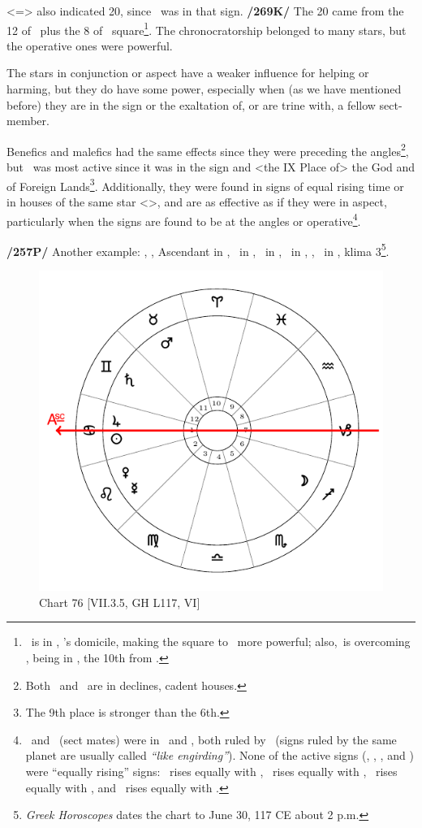\Virgo <=\Mercury> also indicated 20, since \Jupiter\, was in that sign. \textbf{/269K/} The 20 came from the 12 of \Jupiter\, plus the 8 of \Venus\, square\footnote{\Venus\, is in \Sagittarius, \Jupiter's domicile, making the square to \Jupiter\, more powerful; also,  \Jupiter\,is overcoming \Venus, being in \Virgo, the 10th from \Sagittarius.}. The chronocratorship belonged to many stars, but the operative ones were powerful. 

The \mndl stars in conjunction or aspect have a weaker influence for helping or harming, but they do have some power, especially when (as we have mentioned before) they are in the sign or the exaltation of, or are trine with, a fellow sect-member. 

Benefics and malefics had the same effects since they were preceding the angles\footnote{Both \Jupiter\, and \Saturn\, are in declines, cadent houses.}, but \Jupiter\, was most active since it was in the sign and <the IX Place of> the God and of Foreign Lands\footnote{The 9th place is stronger than the 6th.}. Additionally, they were found in signs of equal rising time or in houses of the same star <\Mercury>, and are as effective as if they were in aspect, particularly when the signs are found to be at
the angles or operative\footnote{\Jupiter\, and \Saturn\, (sect mates) were in \Virgo\, and \Gemini, both ruled by \Mercury\, (signs ruled by the same planet are usually called \textsl{``like engirding''}). None of the active signs (\Sagittarius, \Scorpio, \Virgo, and \Gemini) were ``equally rising'' signs: \Sagittarius\, rises equally with \Cancer, \Scorpio\, rises equally with \Leo, \Virgo\, rises equally with \Libra, and \Gemini\, rises equally with \Capricorn.}.

\newpage
\textbf{/257P/} Another example: \Sun, \Jupiter, Ascendant in \Cancer, \Moon\, in \Sagittarius, \Saturn\, in \Gemini,
\Mars\, in \Taurus, \Venus, \Mercury\, in \Leo, klima 3\footnote{\textit{Greek Horoscopes} dates the chart to June 30, 117 CE about 2 p.m.}.

\begin{figure}
\centering
\vspace{-2em}
\includegraphics[width=.68\textwidth]{charts/7_3_5}
\caption{Chart 76 [VII.3.5, GH L117, VI]}
\label{fig:chart76}
\end{figure} 


